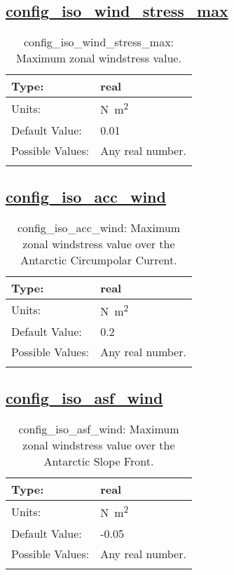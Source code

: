 \subsection[config\_iso\_wind\_stress\_max]{\hyperref[sec:nm_tab_iso]{config\_iso\_wind\_stress\_max}}
\label{subsec:nm_sec_config_iso_wind_stress_max}
\begin{center}
\begin{longtable}{| p{2.0in} || p{4.0in} |}
    \hline
    Type: & real \\
    \hline
    Units: & \si{N.m^{2}} \\
    \hline
    Default Value: & 0.01 \\
    \hline
    Possible Values: & Any real number. \\
    \hline
    \caption{config\_iso\_wind\_stress\_max: Maximum zonal windstress value.}
\end{longtable}
\end{center}
\subsection[config\_iso\_acc\_wind]{\hyperref[sec:nm_tab_iso]{config\_iso\_acc\_wind}}
\label{subsec:nm_sec_config_iso_acc_wind}
\begin{center}
\begin{longtable}{| p{2.0in} || p{4.0in} |}
    \hline
    Type: & real \\
    \hline
    Units: & \si{N.m^{2}} \\
    \hline
    Default Value: & 0.2 \\
    \hline
    Possible Values: & Any real number. \\
    \hline
    \caption{config\_iso\_acc\_wind: Maximum zonal windstress value over the Antarctic Circumpolar Current.}
\end{longtable}
\end{center}
\subsection[config\_iso\_asf\_wind]{\hyperref[sec:nm_tab_iso]{config\_iso\_asf\_wind}}
\label{subsec:nm_sec_config_iso_asf_wind}
\begin{center}
\begin{longtable}{| p{2.0in} || p{4.0in} |}
    \hline
    Type: & real \\
    \hline
    Units: & \si{N.m^{2}} \\
    \hline
    Default Value: & -0.05 \\
    \hline
    Possible Values: & Any real number. \\
    \hline
    \caption{config\_iso\_asf\_wind: Maximum zonal windstress value over the Antarctic Slope Front.}
\end{longtable}
\end{center}
